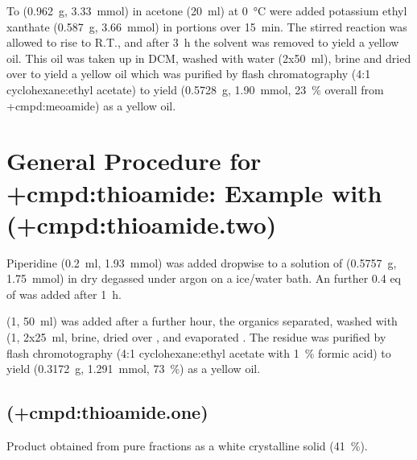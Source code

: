 {To  (\SI{0.962}{\gram}, \SI{3.33}{\milli\mol}) in acetone ({\SI{20}{\milli\litre}}) at \SI{0}{\celsius} were added potassium ethyl xanthate (\SI{0.587}{\gram}, \SI{3.66}{\milli\mol}) in portions over \SI{15}{\minute}. The stirred reaction was allowed to rise to R.T., and after \SI{3}{\hour} the solvent was removed \invacuo to yield a yellow oil. This oil was taken up in DCM, washed with water (2x\SI{50}{\milli\litre}), brine and dried over  to yield a yellow oil which was purified by flash chromatography (4:1 cyclohexane:ethyl acetate) to yield  (\SI{0.5728}{\gram}, \SI{1.90}{\milli\mol}, \SI{23}{\percent} overall from \cmpd+{cmpd:meoamide}) as a yellow oil.


\section{General Procedure for \cmpd+{cmpd:thioamide}:
Example with  (\cmpd+{cmpd:thioamide.two})}

Piperidine (\SI{0.2}{\milli\litre}, \SI{1.93}{\milli\mol}) was added dropwise to a solution of  (\SI{0.5757}{\gram}, \SI{1.75}{\milli\mol}) in dry degassed  under argon on a ice/water bath. An further 0.4 eq of  was added after \SI{1}{\hour}.

 (\SI{1}{\Molar}, \SI{50}{\milli\litre}) was added after a further hour, the organics separated, washed with  (\SI{1}{\Molar}, 2x\SI{25}{\milli\litre}, brine, dried over , and evaporated \invacuo. The residue was purified by flash chromotography (4:1 cyclohexane:ethyl acetate with \SI{1}{\percent} formic acid) to yield  (\SI{0.3172}{\gram}, \SI{1.291}{\milli\mol}, \SI{73}{\percent}) as a yellow oil.

    \subsection{ (\cmpd+{cmpd:thioamide.one})}
    Product  obtained from pure fractions as a white crystalline solid (\SI{41}{\percent}).


}
